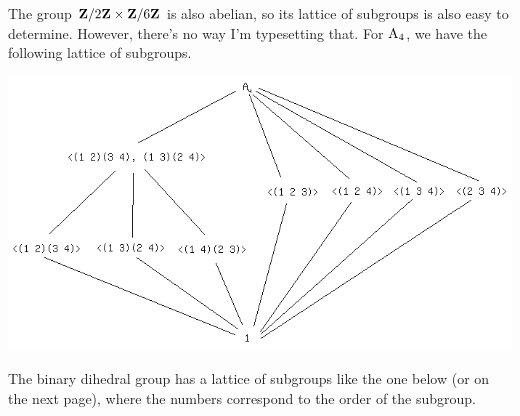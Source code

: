\documentclass[11pt, oneside]{amsart}
\begin{document}
The group $\mathbf Z / 2\mathbf Z\times\mathbf Z / 6\mathbf Z$ is also abelian, so its lattice of subgroups is also easy to determine. However, there's no way I'm typesetting that. For $\operatorname{A}_4$, we have the following lattice of subgroups. 
\begin{center}
\includegraphics [scale = 0.5] {images/a_4} %
\end{center}

The binary dihedral group has a lattice of subgroups like the one below (or on the next page), where the numbers correspond to the order of the subgroup.
\begin{center}
\end{center}
\end{document}

